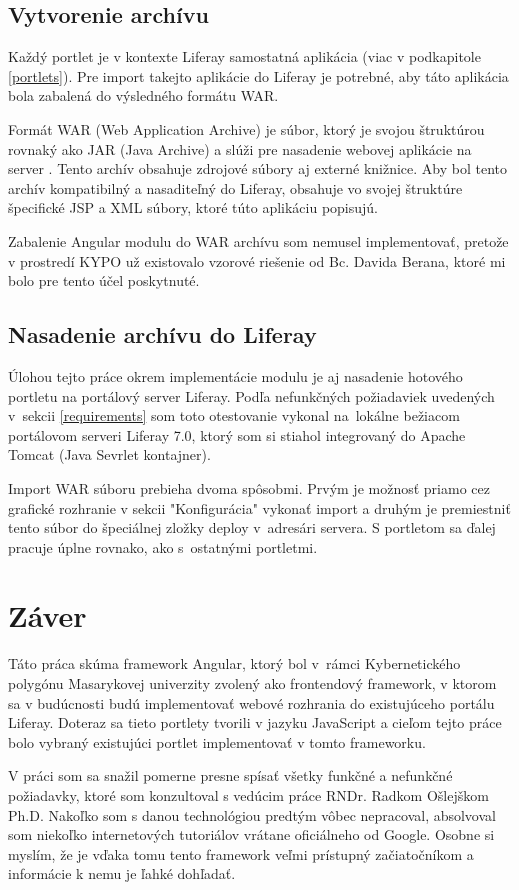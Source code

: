 \documentclass[
  digital, %
  twoside, %
  notable,   %
  nolof,   %
  nolot,   %
]{fithesis3}
\newcommand{\inquotes}[1]{{}"{}#1{}"{}}
\begin{document}
\section{Vytvorenie archívu}
Každý portlet je v kontexte Liferay samostatná aplikácia (viac v podkapitole \ref{portlets}). Pre import takejto aplikácie do Liferay je potrebné, aby táto aplikácia bola zabalená do výsledného formátu WAR.

Formát WAR (Web Application Archive) je súbor, ktorý je svojou štruktúrou rovnaký ako JAR (Java Archive) a slúži pre nasadenie webovej aplikácie na server \cite{javaWorld}. Tento archív obsahuje zdrojové súbory aj externé knižnice. Aby bol tento archív kompatibilný a nasaditeľný do Liferay, obsahuje vo svojej štruktúre špecifické JSP a XML súbory, ktoré túto aplikáciu popisujú.

Zabalenie Angular modulu do WAR archívu som nemusel implementovať, pretože v prostredí KYPO už existovalo vzorové riešenie od Bc. Davida Berana, ktoré mi bolo pre tento účel poskytnuté.

\section{Nasadenie archívu do Liferay}
Úlohou tejto práce okrem implementácie modulu je aj nasadenie hotového portletu na portálový server Liferay. Podľa nefunkčných požiadaviek uvedených v~sekcii \ref{requirements} som toto otestovanie vykonal na~lokálne bežiacom portálovom serveri Liferay 7.0, ktorý som si stiahol integrovaný do Apache Tomcat (Java Sevrlet kontajner).

Import WAR súboru prebieha dvoma spôsobmi. Prvým je možnosť priamo cez grafické rozhranie v sekcii \inquotes{Konfigurácia} vykonať import a druhým je premiestniť tento súbor do špeciálnej zložky deploy v~adresári servera. S portletom sa ďalej pracuje úplne rovnako, ako s~ostatnými portletmi.

\chapter{Záver}
Táto práca skúma framework Angular, ktorý bol v~rámci Kybernetického polygónu Masarykovej univerzity zvolený ako frontendový framework, v ktorom sa v budúcnosti budú implementovať webové rozhrania do existujúceho portálu Liferay. Doteraz sa tieto portlety tvorili v jazyku JavaScript a cieľom tejto práce bolo vybraný existujúci portlet implementovať v tomto frameworku.

V práci som sa snažil pomerne presne spísať všetky funkčné a nefunkčné požiadavky, ktoré som konzultoval s vedúcim práce RNDr. Radkom Ošlejškom Ph.D. Nakoľko som s danou technológiou predtým vôbec nepracoval, absolvoval som niekoľko internetových tutoriálov vrátane oficiálneho od Google. Osobne si myslím, že je vďaka tomu tento framework veľmi prístupný začiatočníkom a informácie k nemu je ľahké dohľadať.
\end{document}
